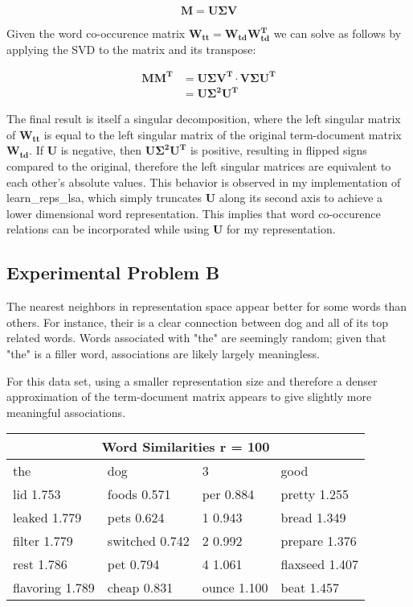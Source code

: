 \begin{equation*}
    \bm{M} = \bm{U \Sigma V}
\end{equation*}

Given the word co-occurence matrix $\bm{W_{tt}} = \bm{W_{td}W_{td}^T}$ we can solve as follows by applying the SVD to the matrix and its transpose:

\begin{align*}
    \bm{MM^T} & = \bm{U \Sigma V^T} \cdot \bm{V \Sigma U^T} \\
              & = \bm{U \Sigma^2 U^T}
\end{align*}

The final result is itself a singular decomposition, where the left singular matrix of $\bm{W_{tt}}$ is equal to the left singular matrix of the original term-document matrix $\bm{W_{td}}$.
If $\bm{U}$ is negative, then $\bm{U \Sigma^2 U^T}$ is positive, resulting in flipped signs compared to the original, therefore the left singular matrices are equivalent to each other's absolute values. This behavior is observed in my implementation of learn\_reps\_lsa, which simply truncates $\bm{U}$ along its second axis to achieve a lower dimensional word representation. This implies that word co-occurence relations can be incorporated while using $\bm{U}$ for my representation.

\subsection*{Experimental Problem B}

The nearest neighbors in representation space appear better for some words than others. For instance, their is a clear connection between dog and all of its top related words. Words associated with "the" are seemingly random; given that "the" is a filler word, associations are likely largely meaningless.

For this data set, using a smaller representation size and therefore a denser approximation of the term-document matrix appears to give slightly more meaningful associations.

\begin{tabular}{ |p{3cm}|p{3cm}|p{3cm}|p{3cm}|  }
    \hline
    \multicolumn{4}{|c|}{Word Similarities r = 100}                 \\
    \hline
    the             & dog            & 3           & good           \\
    \hline
    lid 1.753       & foods 0.571    & per 0.884   & pretty 1.255   \\
    leaked 1.779    & pets 0.624     & 1 0.943     & bread 1.349    \\
    filter 1.779    & switched 0.742 & 2 0.992     & prepare 1.376  \\
    rest 1.786      & pet 0.794      & 4 1.061     & flaxseed 1.407 \\
    flavoring 1.789 & cheap 0.831    & ounce 1.100 & beat 1.457     \\
    \hline
\end{tabular}

